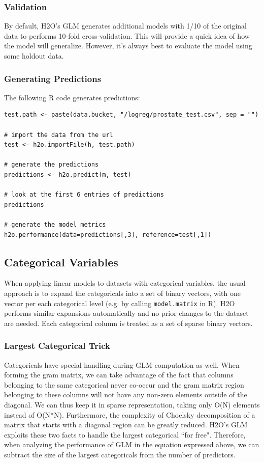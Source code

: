 \documentclass{article}[11pt]
\begin{document}
\subsubsection{Validation}

By default, H2O's GLM generates additional models with 1/10 of the original data to performs 10-fold cross-validation. This will provide a quick idea of how the model will generalize. However, it's always best to evaluate the model using some holdout data.

\subsubsection{Generating Predictions}

The following R code generates predictions:

\begin{verbatim}
test.path <- paste(data.bucket, "/logreg/prostate_test.csv", sep = "")

# import the data from the url
test <- h2o.importFile(h, test.path)

# generate the predictions
predictions <- h2o.predict(m, test)

# look at the first 6 entries of predictions
predictions

# generate the model metrics
h2o.performance(data=predictions[,3], reference=test[,1])
\end{verbatim}
\subsection{Categorical Variables}
When applying linear models to datasets with categorical variables, the usual approach is to expand the categoricals into a set of binary vectors, with one vector per each categorical level (e.g. by calling {\texttt{model.matrix}} in R). H2O performs similar expansions automatically and no prior changes to the dataset are needed. Each categorical column is treated as a set of sparse binary vectors.

\subsubsection{Largest Categorical Trick}
Categoricals have special handling during GLM computation as well. When forming the gram matrix, we can take advantage of  the fact that columns belonging to the same categorical never co-occur and the gram matrix region belonging to these columns will not have any non-zero elements outside of the diagonal. We can thus keep it in sparse representation, taking only O(N) elements instead of O(N*N). Furthermore, the complexity of Choelsky decomposition of a matrix that starts with a diagonal region can be greatly reduced. H2O's GLM exploits these two facts to handle the largest categorical ``for free". Therefore, when analyzing the performance of GLM in the equation expressed above, we can subtract the size of the largest categoricals from the number of predictors.
\end{document}
